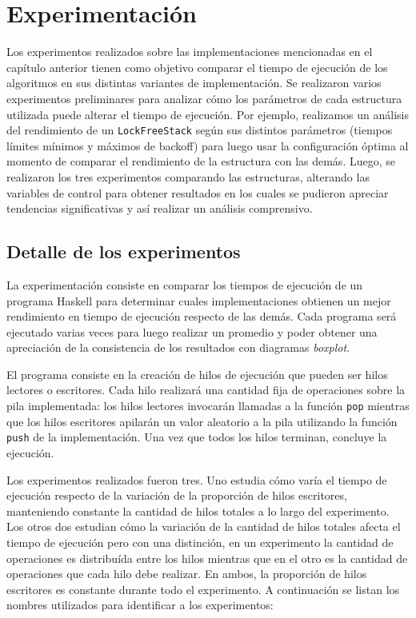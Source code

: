 \chapter{Experimentación}\label{chap:experiments}
Los experimentos realizados sobre las implementaciones mencionadas en el capítulo anterior tienen como objetivo comparar el tiempo de ejecución de los algoritmos en sus distintas variantes de implementación.
Se realizaron varios experimentos preliminares para analizar cómo los parámetros de cada estructura utilizada puede alterar el tiempo de ejecución.
Por ejemplo, realizamos un análisis del rendimiento de un \texttt{LockFreeStack} según sus distintos parámetros (tiempos límites mínimos y máximos de backoff) para luego usar la configuración óptima al momento de comparar el rendimiento de la estructura con las demás.
Luego, se realizaron los tres experimentos comparando las estructuras, alterando las variables de control para obtener resultados en los cuales se pudieron apreciar tendencias significativas y así realizar un análisis comprensivo.

\section{Detalle de los experimentos}\label{sec:experiment-details}

La experimentación consiste en comparar los tiempos de ejecución de un programa Haskell para determinar cuales implementaciones obtienen un mejor rendimiento en tiempo de ejecución respecto de las demás.
Cada programa será ejecutado varias veces para luego realizar un promedio y poder obtener una apreciación de la consistencia de los resultados con diagramas \emph{boxplot}.

El programa consiste en la creación de hilos de ejecución que pueden ser hilos lectores o escritores.
Cada hilo realizará una cantidad fija de operaciones sobre la pila implementada: los hilos lectores invocarán llamadas a la función \texttt{pop} mientras que los hilos escritores apilarán un valor aleatorio a la pila utilizando la función \texttt{push} de la implementación. Una vez que todos los hilos terminan, concluye la ejecución.

Los experimentos realizados fueron tres.
Uno estudia cómo varía el tiempo de ejecución respecto de la variación de la proporción de hilos escritores, manteniendo constante la cantidad de hilos totales a lo largo del experimento.
Los otros dos estudian cómo la variación de la cantidad de hilos totales afecta el tiempo de ejecución pero con una distinción, en un experimento la cantidad de operaciones es distribuída entre los hilos mientras que en el otro es la cantidad de operaciones que cada hilo debe realizar. En ambos, la proporción de hilos escritores es constante durante todo el experimento.
A continuación se listan los nombres utilizados para identificar a los experimentos:

